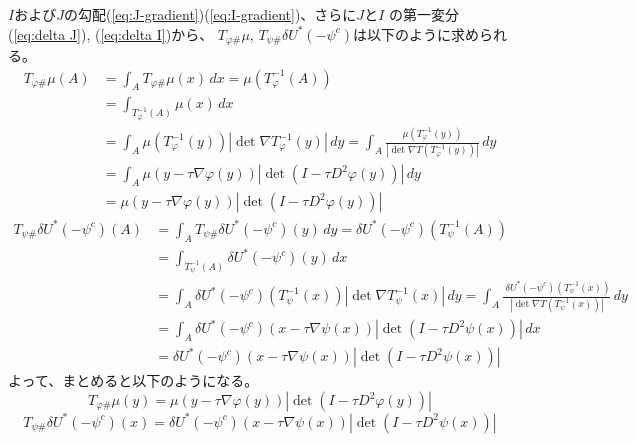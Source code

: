 $I$および$J$の勾配(\ref{eq:J-gradient})(\ref{eq:I-gradient})、さらに$J$と$I$ の第一変分(\ref{eq:delta J}), (\ref{eq:delta I})から、
$T_{\varphi \#} \mu$, $T_{\psi \#} \delta U^*(- \psi^c)$は以下のように求められる。
\begin{align*}
    T_{\varphi \#} \mu (A) &= \int_A T_{\varphi \#} \mu (x)\, dx = \mu(T^{-1}_\varphi (A))\\
                        &= \int_{T^{-1}_\varphi (A)} \mu(x) \, dx\\
                        &= \int_A \mu \left( T^{-1}_\varphi(y) \right) |\det \nabla T^{-1}_\varphi (y)|\, dy = \int_A \frac{\mu \left( T^{-1}_\varphi(y) \right)}{|\det \nabla T\left(T^{-1}_\varphi (y)\right)|}\, dy\\
                        &= \int_A \mu(y - \tau \nabla \varphi(y))|\det (I - \tau D^2 \varphi(y))|\, dy\\
                        &= \mu(y - \tau \nabla \varphi(y))|\det (I - \tau D^2 \varphi(y))|
\end{align*}
\begin{align*}
    T_{\psi \#} \delta U^* (- \psi^c) (A)   &= \int_A T_{\psi \#} \delta U^* (- \psi^c) (y)\, dy =  \delta U^* (- \psi^c)(T^{-1}_\psi (A))\\
                                            &= \int_{T^{-1}_\psi (A)} \delta U^* (- \psi^c) (y) \, dx\\
                                            &= \int_A  \delta U^* (- \psi^c)  \left(T^{-1}_\psi (x) \right) |\det \nabla T^{-1}_\psi (x)|\, dy = \int_A \frac{\ \delta U^* (- \psi^c)  \left( T^{-1}_\psi(x) \right)}{|\det \nabla T\left(T^{-1}_\psi (x)\right)|}\, dy\\
                                            &= \int_A \delta U^* (- \psi^c)(x - \tau \nabla \psi(x))|\det (I - \tau D^2 \psi(x))|\, dx\\
                                            &= \delta U^* (- \psi^c)(x - \tau \nabla \psi(x))|\det (I - \tau D^2 \psi(x))|
\end{align*}
よって、まとめると以下のようになる。
\begin{equation}
    \label{eq:pushforward Tphi}
    T_{\varphi \#} \mu (y) =\mu(y - \tau \nabla \varphi(y))|\det (I - \tau D^2 \varphi(y))|
\end{equation}
\begin{equation}
    \label{eq:pushforward Tpsi}
    T_{\psi \#} \delta U^* (- \psi^c)(x) =\delta U^* (- \psi^c)(x - \tau \nabla \psi(x))|\det (I - \tau D^2 \psi(x))|
\end{equation}
